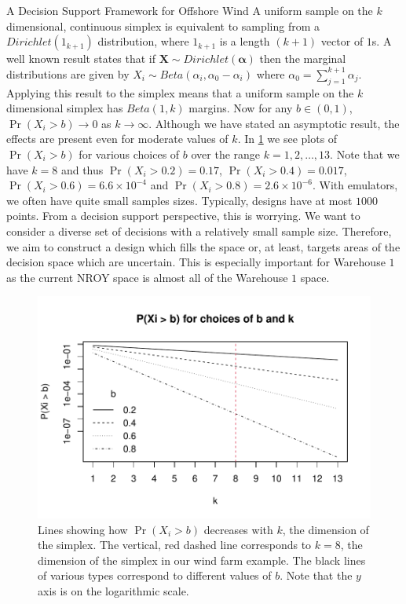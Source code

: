 \begin{chapter}{A Decision Support Framework for Offshore Wind \label{Ch:ds-for-ow}}
A uniform sample on the $k$ dimensional, continuous simplex is equivalent to sampling from a $Dirichlet(1_{k+1})$ distribution, where $1_{k+1}$ is a length $(k+1)$ vector of $1$s. A well known result states that if $\bm{X} \sim Dirichlet(\bm{\alpha})$ then the marginal distributions are given by $X_i \sim Beta(\alpha_i, \alpha_0 - \alpha_i)$ where $\alpha_0 = \sum_{j=1}^{k+1} \alpha_j$. Applying this result to the simplex means that a uniform sample on the $k$ dimensional simplex has $Beta(1, k)$ margins. Now for any $b \in (0,1)$, $\Pr (X_i > b) \to 0$ as $k \to \infty$. Although we have stated an asymptotic result, the effects are present even for moderate values of $k$. In \cref{Fig:beta-plot} we see plots of $\Pr (X_i > b)$ for various choices of $b$ over the range $k = 1, 2, \ldots, 13$. Note that we have $k = 8$ and thus $\Pr(X_i > 0.2) = 0.17$, $\Pr(X_i > 0.4) = 0.017$, $\Pr(X_i > 0.6) = 6.6 \times 10^{-4}$ and $\Pr(X_i > 0.8) = 2.6 \times 10^{-6}$. With emulators, we often have quite small samples sizes. Typically, designs have at most $1000$ points. From a decision support perspective, this is worrying. We want to consider a diverse set of decisions with a relatively small sample size. Therefore, we aim to construct a design which fills the space or, at least, targets areas of the decision space which are uncertain. This is especially important for Warehouse $1$ as the current NROY space is almost all of the Warehouse $1$ space.
\begin{figure}
 \centering
 \includegraphics{fig-ds/beta-plot.pdf}
 \caption{Lines showing how $\Pr(X_i > b)$ decreases with $k$, the dimension of the simplex. The vertical, red dashed line corresponds to $k = 8$, the dimension of the simplex in our wind farm example. The black lines of various types correspond to different values of $b$. Note that the $y$ axis is on the logarithmic scale. \label{Fig:beta-plot}}
\end{figure}


\end{chapter}

